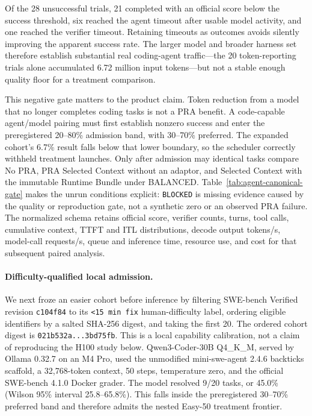 \documentclass[11pt]{article}
\begin{document}
Of the 28 unsuccessful trials, 21 completed with an official score below the
success threshold, six reached the agent timeout after usable model activity,
and one reached the verifier timeout. Retaining timeouts as outcomes avoids
silently improving the apparent success rate. The larger model and broader
harness set therefore establish substantial real coding-agent traffic---the 20
token-reporting trials alone accumulated 6.72 million input tokens---but not a
stable enough quality floor for a treatment comparison.

This negative gate matters to the product claim. Token reduction from a model
that no longer completes coding tasks is not a PRA benefit. A code-capable
agent/model pairing must first establish nonzero success and enter the
preregistered 20--80\% admission band, with 30--70\% preferred. The expanded
cohort's 6.7\% result falls below that lower boundary, so the scheduler correctly withheld treatment
launches. Only after admission may identical tasks compare
No PRA, PRA Selected Context without an adaptor, and Selected Context with the
immutable Runtime Bundle under
BALANCED. Table~\ref{tab:agent-canonical-gate} makes the unrun conditions
explicit: \texttt{BLOCKED} is missing evidence caused by the quality or
reproduction gate, not a synthetic zero or an observed PRA failure. The normalized schema retains
official score, verifier counts, turns, tool calls, cumulative context, TTFT
and ITL distributions, decode output tokens/s, model-call requests/s, queue and
inference time, resource use, and cost for that subsequent paired analysis.

\paragraph{Difficulty-qualified local admission.}
We next froze an easier cohort before inference by filtering SWE-bench Verified
revision \texttt{c104f84} to its \texttt{<15 min fix} human-difficulty label,
ordering eligible identifiers by a salted SHA-256 digest, and taking the first
20. The ordered cohort digest is \texttt{021b532a...3bd75fb}. This is a local
capability calibration, not a claim of reproducing the H100 study below.
Qwen3-Coder-30B Q4\_K\_M, served by Ollama 0.32.7 on an M4 Pro, used the
unmodified mini-swe-agent 2.4.6 backticks scaffold, a 32,768-token context,
50 steps, temperature zero, and the official SWE-bench 4.1.0 Docker grader.
The model resolved 9/20 tasks, or 45.0\% (Wilson 95\% interval
25.8--65.8\%). This falls inside the preregistered 30--70\% preferred band and
therefore admits the nested Easy-50 treatment frontier.
\end{document}

